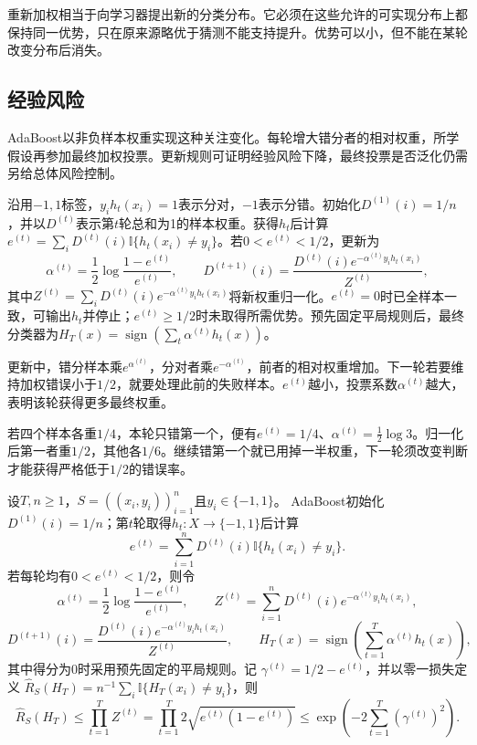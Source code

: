 重新加权相当于向学习器提出新的分类分布。它必须在这些允许的可实现分布上都保持同一优势，只在原来源略优于猜测不能支持提升。优势可以小，但不能在某轮改变分布后消失。

\subsection{经验风险}

AdaBoost以非负样本权重实现这种关注变化。每轮增大错分者的相对权重，所学假设再参加最终加权投票。更新规则可证明经验风险下降，最终投票是否泛化仍需另给总体风险控制。

沿用$-1,1$标签，$y_ih_t(x_i)=1$表示分对，$-1$表示分错。初始化$D^{(1)}(i)=1/n$，并以$D^{(t)}$表示第$t$轮总和为1的样本权重。获得$h_t$后计算$e^{(t)}=\sum_iD^{(t)}(i)\mathbb I\{h_t(x_i)\neq y_i\}$。若$0<e^{(t)}<1/2$，更新为
\begin{equation}
 \alpha^{(t)}=\frac12\log\frac{1-e^{(t)}}{e^{(t)}},\qquad
 D^{(t+1)}(i)=\frac{D^{(t)}(i)e^{-\alpha^{(t)} y_i h_t(x_i)}}{Z^{(t)}},
 \label{eq:adaboost-update}
\end{equation}
其中$Z^{(t)}=\sum_iD^{(t)}(i)e^{-\alpha^{(t)}y_ih_t(x_i)}$将新权重归一化。$e^{(t)}=0$时已全样本一致，可输出$h_t$并停止；$e^{(t)}\geq1/2$时未取得所需优势。预先固定平局规则后，最终分类器为$H_T(x)=\operatorname{sign}(\sum_t\alpha^{(t)}h_t(x))$。

更新中，错分样本乘$e^{\alpha^{(t)}}$，分对者乘$e^{-\alpha^{(t)}}$，前者的相对权重增加。下一轮若要维持加权错误小于$1/2$，就要处理此前的失败样本。$e^{(t)}$越小，投票系数$\alpha^{(t)}$越大，表明该轮获得更多最终权重。

若四个样本各重$1/4$，本轮只错第一个，便有$e^{(t)}=1/4$、$\alpha^{(t)}=\tfrac12\log3$。归一化后第一者重$1/2$，其他各$1/6$。继续错第一个就已用掉一半权重，下一轮须改变判断才能获得严格低于$1/2$的错误率。

\begin{theorem}[AdaBoost经验风险界]
\label{thm:adaboost-training-error}
设$T,n\geq1$，$S=((x_i,y_i))_{i=1}^n$且$y_i\in\{-1,1\}$。
AdaBoost初始化$D^{(1)}(i)=1/n$；第$t$轮取得$h_t:X\to\{-1,1\}$后计算
\[
 e^{(t)}=\sum_{i=1}^nD^{(t)}(i)\mathbb I\{h_t(x_i)\neq y_i\}.
\]
若每轮均有$0<e^{(t)}<1/2$，则令
\[
 \alpha^{(t)}=\frac12\log\frac{1-e^{(t)}}{e^{(t)}},\qquad
 Z^{(t)}=\sum_{i=1}^nD^{(t)}(i)e^{-\alpha^{(t)}y_i h_t(x_i)},
\]
\[
 D^{(t+1)}(i)
 =\frac{D^{(t)}(i)e^{-\alpha^{(t)}y_i h_t(x_i)}}{Z^{(t)}},
 \qquad
 H_T(x)=\operatorname{sign}\!\left(\sum_{t=1}^T\alpha^{(t)}h_t(x)\right),
\]
其中得分为0时采用预先固定的平局规则。记
$\gamma^{(t)}=1/2-e^{(t)}$，并以零一损失定义
$\hat R_S(H_T)=n^{-1}\sum_i\mathbb I\{H_T(x_i)\neq y_i\}$，则
\begin{equation}
 \hat R_S(H_T)\leq\prod_{t=1}^T Z^{(t)}
 =\prod_{t=1}^T2\sqrt{e^{(t)}(1-e^{(t)})}
 \leq\exp\left(-2\sum_{t=1}^T(\gamma^{(t)})^2\right).
 \label{eq:adaboost-training-bound}
\end{equation}
\end{theorem}

